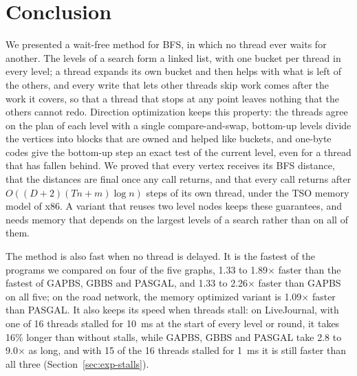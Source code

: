 \section{Conclusion}
\label{sec:conclusion}

We presented a wait-free method for BFS, in which no thread ever waits for another. The levels of a search form a linked list, with one bucket per thread in every level; a thread expands its own bucket and then helps with what is left of the others, and every write that lets other threads skip work comes after the work it covers, so that a thread that stops at any point leaves nothing that the others cannot redo. Direction optimization keeps this property: the threads agree on the plan of each level with a single compare-and-swap, bottom-up levels divide the vertices into blocks that are owned and helped like buckets, and one-byte codes give the bottom-up step an exact test of the current level, even for a thread that has fallen behind. We proved that every vertex receives its BFS distance, that the distances are final once any call returns, and that every call returns after $O((D+2)(Tn+m)\log n)$ steps of its own thread, under the TSO memory model of x86. A variant that reuses two level nodes keeps these guarantees, and needs memory that depends on the largest levels of a search rather than on all of them.

The method is also fast when no thread is delayed. It is the fastest of the programs we compared on four of the five graphs, 1.33 to 1.89$\times$ faster than the fastest of GAPBS, GBBS and PASGAL, and 1.33 to 2.26$\times$ faster than GAPBS on all five; on the road network, the memory optimized variant is 1.09$\times$ faster than PASGAL. It also keeps its speed when threads stall: on LiveJournal, with one of 16 threads stalled for 10~ms at the start of every level or round, it takes 16\% longer than without stalls, while GAPBS, GBBS and PASGAL take 2.8 to 9.0$\times$ as long, and with 15 of the 16 threads stalled for 1~ms it is still faster than all three (Section~\ref{sec:exp-stalls}).

